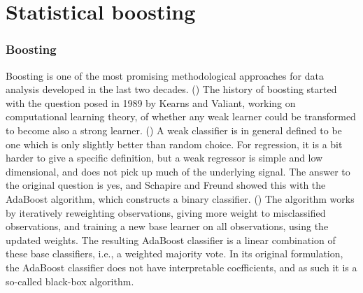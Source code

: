 \chapter{Statistical boosting}
\subsection{Boosting}
Boosting is one of the most promising methodological approaches for data analysis developed in the last two decades. (\cite{mayr14a}) The history of boosting started with the question posed in 1989 by Kearns and Valiant, working on computational learning theory, of whether any weak learner could be transformed to become also a strong learner. (\cite{kearnsvaliant}) A weak classifier is in general defined to be one which is only slightly better than random choice. For regression, it is a bit harder to give a specific definition, but a weak regressor is simple and low dimensional, and does not pick up much of the underlying signal. The answer to the original question is yes, and Schapire and Freund showed this with the AdaBoost algorithm, which constructs a binary classifier. (\cite{adaboost}) The algorithm works by iteratively reweighting observations, giving more weight to misclassified observations, and training a new base learner on all observations, using the updated weights. The resulting AdaBoost classifier is a linear combination of these base classifiers, i.e., a weighted majority vote. In its original formulation, the AdaBoost classifier does not have interpretable coefficients, and as such it is a so-called black-box algorithm.

